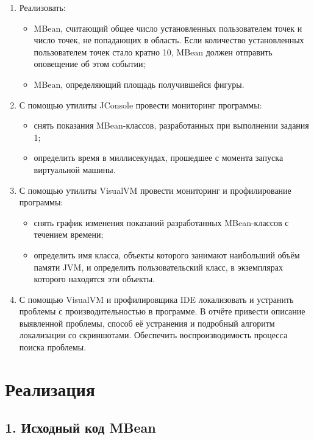 \documentclass[a4paper,14pt]{extarticle}
\begin{document}
\begin{enumerate}[leftmargin=1.2cm]
    \item Реализовать:
    \begin{itemize}
        \item MBean, считающий общее число установленных пользователем точек и число точек, не попадающих в область. Если количество установленных пользователем точек стало кратно 10, MBean должен отправить оповещение об этом событии;
        \item MBean, определяющий площадь получившейся фигуры.
    \end{itemize}

    \item С помощью утилиты JConsole провести мониторинг программы:
    \begin{itemize}
        \item снять показания MBean-классов, разработанных при выполнении задания 1;
        \item определить время в миллисекундах, прошедшее с момента запуска виртуальной машины.
    \end{itemize}

    \item С помощью утилиты VisualVM провести мониторинг и профилирование программы:
    \begin{itemize}
        \item снять график изменения показаний разработанных MBean-классов с течением времени;
        \item определить имя класса, объекты которого занимают наибольший объём памяти JVM, и определить пользовательский класс, в экземплярах которого находятся эти объекты.
    \end{itemize}

    \item С помощью VisualVM и профилировщика IDE локализовать и устранить проблемы с производительностью в программе. В отчёте привести описание выявленной проблемы, способ её устранения и подробный алгоритм локализации со скриншотами. Обеспечить воспроизводимость процесса поиска проблемы.
\end{enumerate}

\newpage
\section*{Реализация}

\subsection*{1. Исходный код MBean}
\end{document}
